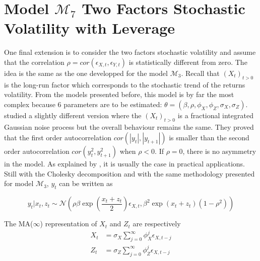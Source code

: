 \documentclass[11pt,a4,twosided,singlespacing,titlepagenumber=on]{scrreprt}
\numberwithin{equation}{chapter} %
\theoremstyle{remark}
\begin{document}
\section{Model $\mathcal{M}_7$ Two Factors Stochastic Volatility with Leverage}

One final extension is to consider the two factors stochastic volatility and assume that the correlation $\rho = cor(\epsilon_{X,t}, \epsilon_{Y,t})$ is statistically different from zero. The idea is the same as the one developped for the model $\mathcal{M}_3$. Recall that $(X_t)_{t>0}$ is the long-run factor which corresponds to the stochastic trend of the returns volatility. From the models presented before, this model is by far the most complex because 6 parameters are to be estimated: $\theta = (\beta, \rho, \phi_X, \phi_Z, \sigma_X, \sigma_Z)$. \cite{ruiz2008} studied a slightly different version where the $(X_t)_{t>0}$ is a fractional integrated Gaussian noise process but the overall behaviour remains the same. They proved that the first order autocorrelation $cor(|y_t|,|y_{t+1}|)$ is smaller than the second order autocorrelation $cor(y_t^2,y_{t+1}^2)$ when $\rho < 0$. If $\rho = 0$, there is no asymmetry in the model. As explained by \cite{cont2005}, it is usually the case in practical applications. Still with the Cholesky decomposition and with the same methodology presented for model $\mathcal{M}_3$, $y_t$ can be written as

$$y_t | x_t, z_t \sim \mathcal{N}\left(\rho \beta \exp \left(\frac{x_t + z_t}{2} \right) \epsilon_{X,t}, \beta^2 \exp(x_t + z_t) (1-\rho^2)\right)$$

\noindent
The MA($\infty$) representation of $X_t$ and $Z_t$ are respectively
\begin{align*}
X_t &= \sigma_X \sum_{j=0}^\infty \phi_X^j \epsilon_{X, t-j} \\
Z_t &= \sigma_Z \sum_{j=0}^\infty \phi_Z^j \epsilon_{X, t-j}
\end{align*}
\end{document}
